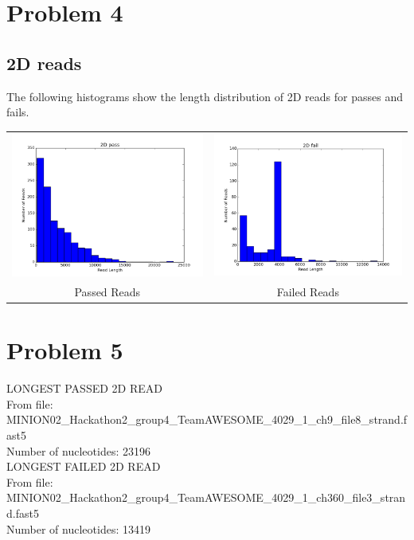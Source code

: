 \documentclass[11pt]{article}
\begin{document}
\section*{Problem 4}
\subsection*{2D reads}

        The following histograms show the length distribution of 2D reads for passes and fails.

        
        \begin{tabular}{cc}
          \includegraphics[width=.48\textwidth]{2Dpasses}
          &
          \includegraphics[width=.48\textwidth]{2Dfailures}
          \\
          Passed Reads
          &
          Failed Reads
        \end{tabular}
\section*{Problem 5}

LONGEST PASSED 2D READ\\
From file: MINION02\_Hackathon2\_group4\_TeamAWESOME\_4029\_1\_ch9\_file8\_strand.fast5\\
Number of nucleotides: 23196\\

LONGEST FAILED 2D READ\\
From file: MINION02\_Hackathon2\_group4\_TeamAWESOME\_4029\_1\_ch360\_file3\_strand.fast5\\
Number of nucleotides: 13419\\
\end{document}
